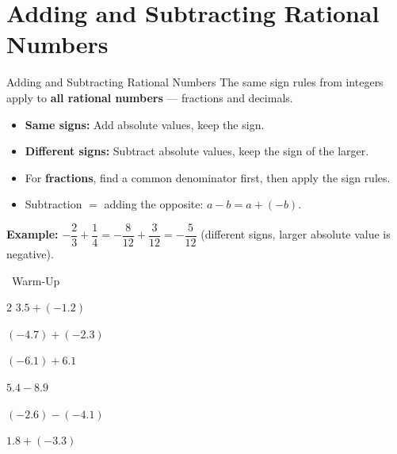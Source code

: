 \section{Adding and Subtracting Rational Numbers}

\begin{quickReview}{Adding and Subtracting Rational Numbers}
The same sign rules from integers apply to \textbf{all rational numbers} — fractions and decimals.

\begin{itemize}[leftmargin=*]
    \item \textbf{Same signs:} Add absolute values, keep the sign.
    \item \textbf{Different signs:} Subtract absolute values, keep the sign of the larger.
    \item For \textbf{fractions}, find a common denominator first, then apply the sign rules.
    \item Subtraction $=$ adding the opposite: $a - b = a + (-b)$.
\end{itemize}

\medskip
\textbf{Example:} $-\dfrac{2}{3} + \dfrac{1}{4} = -\dfrac{8}{12} + \dfrac{3}{12} = -\dfrac{5}{12}$ \quad (different signs, larger absolute value is negative).
\end{quickReview}

\begin{practiceBox}[funGreen]{\faSun~Warm-Up}


\begin{multicols}{2}
\prob $3.5 + (-1.2)$ \answerBlank[2cm]

\prob $(-4.7) + (-2.3)$ \answerBlank[2cm]

\prob $(-6.1) + 6.1$ \answerBlank[2cm]

\prob $5.4 - 8.9$ \answerBlank[2cm]

\prob $(-2.6) - (-4.1)$ \answerBlank[2cm]

\prob $1.8 + (-3.3)$ \answerBlank[2cm]
\end{multicols}
\end{practiceBox}

